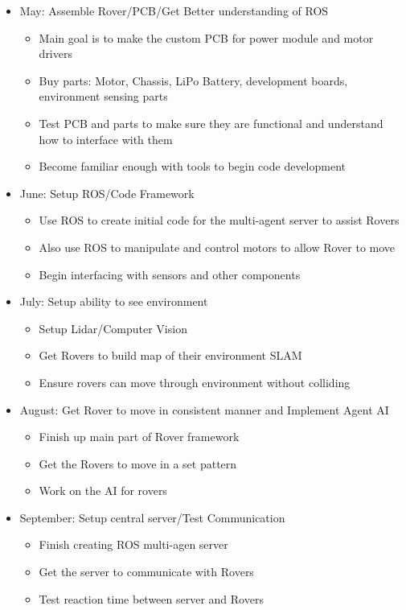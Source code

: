 \documentclass[conference]{IEEEtran}
\begin{document}
\begin{itemize}
	\item May: Assemble Rover/PCB/Get Better understanding of ROS
	\begin{itemize}
		\item Main goal is to make the custom PCB for power module and motor drivers
		\item Buy parts: Motor, Chassis, LiPo Battery, development boards, environment sensing parts
		\item Test PCB and parts to make sure they are functional and understand how to interface with them
		\item Become familiar enough with tools to begin code development
	\end{itemize}
	\item June: Setup ROS/Code Framework
	\begin{itemize}
		\item Use ROS to create initial code for the multi-agent server to assist Rovers
		\item Also use ROS to manipulate and control motors to allow Rover to move
		\item Begin interfacing with sensors and other components
	\end{itemize}
	\item July: Setup ability to see environment
	\begin{itemize}
		\item Setup Lidar/Computer Vision
		\item Get Rovers to build map of their environment SLAM
		\item Ensure rovers can move through environment without colliding
	\end{itemize}
	\item August: Get Rover to move in consistent manner and Implement Agent AI
	\begin{itemize}
		\item Finish up main part of Rover framework
		\item Get the Rovers to move in a set pattern
		\item Work on the AI for rovers
	\end{itemize}
	\item September: Setup central server/Test Communication
	\begin{itemize}
		\item Finish creating ROS multi-agen server
		\item Get the server to communicate with Rovers
		\item Test reaction time between server and Rovers

\end{itemize}
\end{itemize}
\end{document}
